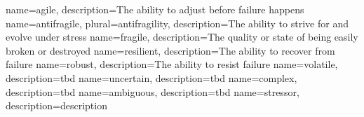
{
	name=agile,
	description={The ability to adjust before failure happens}
}
{
	name=antifragile,
	plural={antifragility},
	description={The ability to strive for and evolve under stress}
}
{
	name=fragile,
	description={The quality or state of being easily broken or destroyed}
}
{
	name=resilient,
	description={The ability to recover from failure}
}
{
	name=robust,
	description={The ability to resist failure}
}
{
	name=volatile,
	description={tbd}
}
{
	name=uncertain,
	description={tbd}
}
{
	name=complex,
	description={tbd}
}
{
	name=ambiguous,
	description={tbd}
}
{
	name={stressor},
	description={description}
}